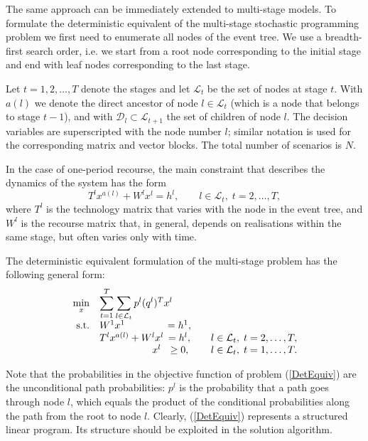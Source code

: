 The same approach can be immediately extended to multi-stage models.
To formulate the deterministic equivalent of the multi-stage 
stochastic programming problem we first need to enumerate all nodes 
of the event tree. We use a breadth-first 
search order, i.e. we start from a root node corresponding 
to the initial stage and end with leaf nodes corresponding 
to the last stage.

Let $t = 1,2,\ldots,T$ denote the stages and let $\mathcal{L}_t$ 
be the set of nodes at stage $t$.
With $a(l)$ we denote the direct ancestor of node $l\in\mathcal{L}_t$ 
(which is a node that belongs to stage $t-1$), and with
$\mathcal{D}_l\subset\mathcal{L}_{t+1}$ the set of children of node $l$.
The decision variables are superscripted with the node number $l$;
similar notation is used for the corresponding matrix and vector blocks.
The total number of scenarios is $N$.

In the case of one-period recourse, 
the main constraint that describes the dynamics of the system has the form 
\[
  T^{l}x^{a(l)} +W^{l}x^{l} =h^{l}, \qquad l \in\mathcal{L}_t,\; t=2,\ldots,T,
\]
%
where $T^{l}$ is the technology matrix that varies 
with the node in the event tree, and $W^{l}$ is the recourse
matrix that, in general, depends on realisations within the same stage,
but often varies only with time.

The deterministic equivalent formulation of the multi-stage 
problem has the following general form:
\begin{equation}  \label{DetEquiv}
  \begin{array}{rlcll}
  \displaystyle\min_x 
    & \displaystyle\sum_{t=1}^T\sum_{l\in\mathcal{L}_t} p^l (q^l)^T x^{l}\\
  \mbox{s.t.} & W^1 x^1            & \hspace{-1.5em} = h^1, \\
    & T^{l} x^{a(l)} + W^{l} x^{l} & \hspace{-1.5em} = h^{l}, 
                               &\quad l\in\mathcal{L}_t,\; t = 2,\dots,T, \\
    & \hspace{5.3em} x^{l}         & \hspace{-1.5em} \geq 0,
                               &\quad l\in\mathcal{L}_t,\; t = 1,\dots,T. \\
  \end{array}
\end{equation}

Note that the probabilities in the objective function of problem 
(\ref{DetEquiv}) are the unconditional path probabilities: $p^l$ is 
the probability that a path goes through node $l$, which equals the 
product of the conditional probabilities along the path from the root 
to node $l$.
Clearly, (\ref{DetEquiv}) represents a structured linear program. Its 
structure should be exploited in the solution algorithm.

